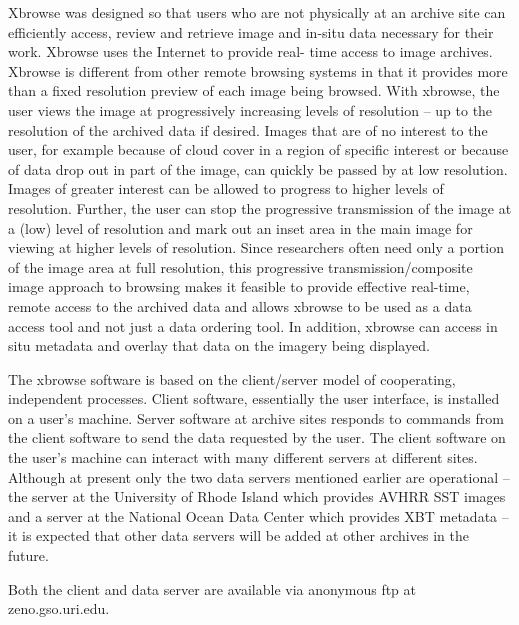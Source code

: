 \medskip
\large
{}
\normalsize
\medskip

	Xbrowse was designed so that users who are not physically at an 
archive site can efficiently access, review and retrieve image and in-situ 
data necessary for their work. Xbrowse uses the Internet to provide real-
time access to image archives. Xbrowse is different from other remote 
browsing systems in that it provides more than a fixed resolution preview 
of each image being browsed.  With xbrowse, the user views the image at 
progressively increasing levels of resolution -- up to the resolution of the 
archived data if desired.  Images that are of no interest to the user, for 
example because of cloud cover in a region of specific interest or because 
of data drop out in part of the image, can quickly be passed by at low 
resolution.  Images of greater interest can be allowed to progress to 
higher levels of resolution.  Further, the user can stop the progressive 
transmission of the image at a (low) level of resolution and mark out an 
inset area in the main image for viewing at higher levels of resolution.  
Since researchers often need only a portion of the image area at full 
resolution, this progressive transmission/composite image approach to 
browsing makes it feasible to provide effective real-time, remote access 
to the archived data and allows xbrowse to be used as a data access tool 
and not just a data ordering tool. In addition, xbrowse can access in situ 
metadata and overlay that data on the imagery being displayed.

	The xbrowse software is based on the client/server model of 
cooperating, independent processes.  Client software, essentially the user 
interface, is installed on a user's machine.  Server software at archive 
sites responds to commands from the client software to send the data 
requested by the user.  The client software on the user's machine can 
interact with many different servers at different sites.  Although at 
present only the two data servers mentioned earlier are operational -- the 
server at the University of Rhode Island which provides AVHRR SST 
images and a server at the National Ocean Data Center which provides XBT 
metadata -- it is expected that other data servers will be added at other 
archives in the future.

	Both the client and data server are available via anonymous ftp at 
zeno.gso.uri.edu. 
\newpage

